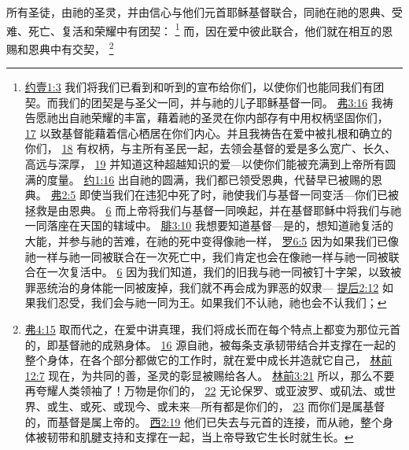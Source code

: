 \documentclass[12pt, a4paper, oneside]{ctexart}
\newcounter{parnum}[section]
\newcommand{\N}{%
   \noindent\refstepcounter{parnum}%
    \makebox[\parindent][l]{\textbf{\arabic{parnum}.}}}
\begin{document}
\N 所有圣徒，由祂的圣灵，并由信心与他们元首耶稣基督联合，同祂在祂的恩典、受难、死亡、复活和荣耀中有团契：
	\footnote {
		\href{https://biblehub.com/1_john/1-3.htm}{约壹1:3} 我们将我们已看到和听到的宣布给你们，以使你们也能同我们有团契。而我们的团契是与圣父一同，并与祂的儿子耶稣基督一同。
		\href{https://biblehub.com/ephesians/3-16.htm}{弗3:16} 我祷告愿祂出自祂荣耀的丰富，藉着祂的圣灵在你内部存有中用权柄坚固你们，
		\href{https://biblehub.com/ephesians/3-17.htm}{17} 以致基督能藉着信心栖居在你们内心。并且我祷告在爱中被扎根和确立的你们，
		\href{https://biblehub.com/ephesians/3-18.htm}{18} 有权柄，与主所有圣民一起，去领会基督的爱是多么宽广、长久、高远与深厚，
		\href{https://biblehub.com/ephesians/3-19.htm}{19} 并知道这种超越知识的爱---以使你们能被充满到上帝所有圆满的度量。
		\href{https://biblehub.com/john/1-16.htm}{约1:16} 出自祂的圆满，我们都已领受恩典，代替早已被赐的恩典。
		\href{https://biblehub.com/ephesians/2-5.htm}{弗2:5} 即使当我们在违犯中死了时，祂使我们与基督一同变活---你们已被拯救是由恩典。
		\href{https://biblehub.com/ephesians/2-6.htm}{6} 而上帝将我们与基督一同唤起，并在基督耶稣中将我们与祂一同落座在天国的辖域中。
		\href{https://biblehub.com/philippians/3-10.htm}{腓3:10} 我想要知道基督---是的，想知道祂复活的大能，并参与祂的苦难，在祂的死中变得像祂一样，
		\href{https://biblehub.com/romans/6-5.htm}{罗6:5} 因为如果我们已像祂一样与祂一同被联合在一次死亡中，我们肯定也会在像祂一样与祂一同被联合在一次复活中。
		\href{https://biblehub.com/romans/6-6.htm}{6} 因为我们知道，我们的旧我与祂一同被钉十字架，以致被罪恶统治的身体能一同被废掉，我们就不再会成为罪恶的奴隶---
		\href{https://biblehub.com/2_timothy/2-12.htm}{提后2:12} 如果我们忍受，我们会与祂一同为王。如果我们不认祂，祂也会不认我们；
	}
	而，因在爱中彼此联合，他们就在相互的恩赐和恩典中有交契，
	\footnote {
		\href{https://biblehub.com/ephesians/4-15.htm}{弗4:15} 取而代之，在爱中讲真理，我们将成长而在每个特点上都变为那位元首的，即基督祂的成熟身体。
		\href{https://biblehub.com/ephesians/4-16.htm}{16} 源自祂，被每条支承韧带结合并支撑在一起的整个身体，在各个部分都做它的工作时，就在爱中成长并造就它自己，
		\href{https://biblehub.com/1_corinthians/12-7.htm}{林前12:7} 现在，为共同的善，圣灵的彰显被赐给各人。
		\href{https://biblehub.com/1_corinthians/3-21.htm}{林前3:21} 所以，那么不要再夸耀人类领袖了！万物是你们的，
		\href{https://biblehub.com/1_corinthians/3-22.htm}{22} 无论保罗、或亚波罗、或矶法、或世界、或生、或死、或现今、或未来---所有都是你们的，
		\href{https://biblehub.com/1_corinthians/3-23.htm}{23} 而你们是属基督的，而基督是属上帝的。
		\href{https://biblehub.com/colossians/2-19.htm}{西2:19} 他们已失去与元首的连接，而从祂，整个身体被韧带和肌腱支持和支撑在一起，当上帝导致它生长时就生长。
	}
\end{document}
